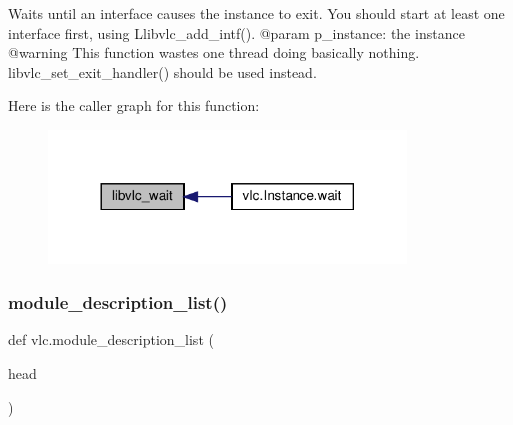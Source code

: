 \begin{DoxyVerb}Waits until an interface causes the instance to exit.
You should start at least one interface first, using L{libvlc_add_intf}().
@param p_instance: the instance @warning This function wastes one thread doing basically nothing. libvlc_set_exit_handler() should be used instead.
\end{DoxyVerb}
 Here is the caller graph for this function\+:
\nopagebreak
\begin{figure}[H]
\begin{center}
\leavevmode
\includegraphics[width=269pt]{namespacevlc_a613ca585b96e960eb518af03fec03484_icgraph}
\end{center}
\end{figure}
\mbox{\label{namespacevlc_a0b7d068d11a5e7daf054d28358952cc3}} 
\subsubsection{\texorpdfstring{module\+\_\+description\+\_\+list()}{module\_description\_list()}}
{\footnotesize\ttfamily def vlc.\+module\+\_\+description\+\_\+list (\begin{DoxyParamCaption}\item[{}]{head }\end{DoxyParamCaption})}

